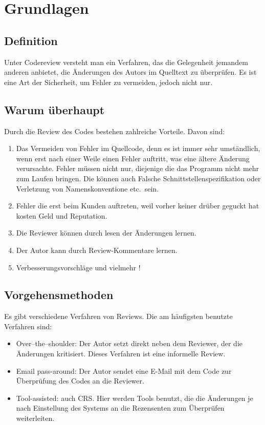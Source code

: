 \section{Grundlagen}
\label{sec:Grundlagen}

\subsection{Definition}
\label{subsec:Definition}
Unter Codereview versteht man ein Verfahren, das die Gelegenheit jemandem anderen anbietet, die Änderungen des Autors im Quelltext zu überprüfen.
Es ist eine Art der Sicherheit, um Fehler zu vermeiden, jedoch nicht nur.

\subsection{Warum überhaupt}
\label{subsec:Gründe}
Durch die Review des Codes bestehen zahlreiche Vorteile. Davon sind:

\begin{enumerate}
	\item Das Vermeiden von Fehler im Quellcode, denn es ist immer sehr umständlich, wenn erst nach einer Weile einen Fehler auftritt, was eine ältere Änderung verursachte.
		Fehler müssen nicht nur, diejenige die das Programm nicht mehr zum Laufen bringen. Die können auch Falsche Schnittstellenspezifikation oder Verletzung von Namenskonventione 
		etc.\ sein.
	\item Fehler die erst beim Kunden auftreten, weil vorher keiner drüber geguckt hat kosten Geld und Reputation.
	\item Die Reviewer können durch lesen der Änderungen lernen.
	\item Der Autor kann durch Review-Kommentare lernen.
	\item Verbesserungsvorschläge und vielmehr !
\end{enumerate}

\subsection{Vorgehensmethoden}
\label{subsec:Vorgehensmethoden}
Es gibt verschiedene Verfahren von Reviews. Die am häufigsten benutzte Verfahren sind:

\begin{itemize}
	\item Over–the–shoulder: Der Autor setzt direkt neben dem Reviewer, der die Änderungen kritisiert. Dieses Verfahren ist eine informelle Review.
	\item Email pass-around: Der Autor sendet eine E-Mail mit dem Code zur Überprüfung des Codes an die Reviewer.
	\item Tool-assisted: auch \ac{CRS}. Hier werden Tools benutzt, die die Änderungen je nach Einstellung des Systems an die Rezensenten zum Überprüfen weiterleiten.
\end{itemize}
